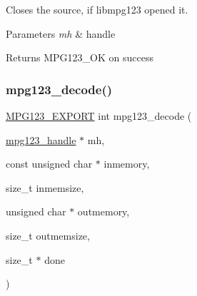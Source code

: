 Closes the source, if libmpg123 opened it. 
\begin{DoxyParams}{Parameters}
{\em mh} & handle \\
\hline
\end{DoxyParams}
\begin{DoxyReturn}{Returns}
M\+P\+G123\+\_\+\+OK on success 
\end{DoxyReturn}
\mbox{\label{group__mpg123__input_gafaf2382b208257a9685a8cab9f4360be}} 
\subsubsection{\texorpdfstring{mpg123\_decode()}{mpg123\_decode()}}
{\footnotesize\ttfamily \mbox{\hyperlink{mpg123_8h_a2ba98cfba3f760879df70e755b2a61cc}{M\+P\+G123\+\_\+\+E\+X\+P\+O\+RT}} int mpg123\+\_\+decode (\begin{DoxyParamCaption}\item[{\mbox{\hyperlink{group__mpg123__init_ga6728e2839a395f3a07d4514da659faca}{mpg123\+\_\+handle}} $\ast$}]{mh,  }\item[{const unsigned char $\ast$}]{inmemory,  }\item[{size\+\_\+t}]{inmemsize,  }\item[{unsigned char $\ast$}]{outmemory,  }\item[{size\+\_\+t}]{outmemsize,  }\item[{size\+\_\+t $\ast$}]{done }\end{DoxyParamCaption})}

